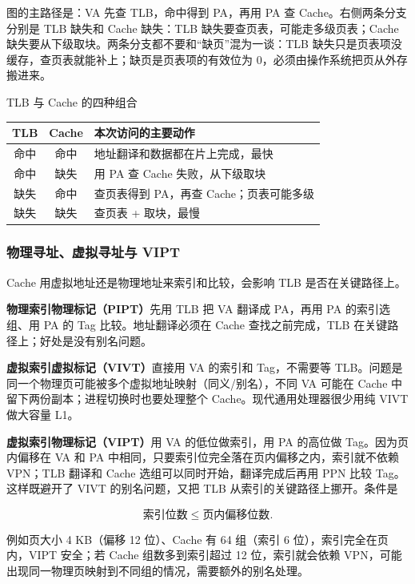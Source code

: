 图的主路径是：VA 先查 TLB，命中得到 PA，再用 PA 查 Cache。右侧两条分支分别是 TLB 缺失和 Cache 缺失：TLB 缺失要查页表，可能走多级页表；Cache 缺失要从下级取块。两条分支都不要和“缺页”混为一谈：TLB 缺失只是页表项没缓存，查页表就能补上；缺页是页表项的有效位为 0，必须由操作系统把页从外存搬进来。

\begin{tablebox}{TLB 与 Cache 的四种组合}
\centering
\begin{tabularx}{\linewidth}{|c|c|X|}
\hline
TLB & Cache & 本次访问的主要动作 \\
\hline
命中 & 命中 & 地址翻译和数据都在片上完成，最快 \\
命中 & 缺失 & 用 PA 查 Cache 失败，从下级取块 \\
缺失 & 命中 & 查页表得到 PA，再查 Cache；页表可能多级 \\
缺失 & 缺失 & 查页表 + 取块，最慢 \\
\hline
\end{tabularx}
\end{tablebox}

\subsubsection*{物理寻址、虚拟寻址与 VIPT}

Cache 用虚拟地址还是物理地址来索引和比较，会影响 TLB 是否在关键路径上。

\textbf{物理索引物理标记（PIPT）}先用 TLB 把 VA 翻译成 PA，再用 PA 的索引选组、用 PA 的 Tag 比较。地址翻译必须在 Cache 查找之前完成，TLB 在关键路径上；好处是没有别名问题。

\textbf{虚拟索引虚拟标记（VIVT）}直接用 VA 的索引和 Tag，不需要等 TLB。问题是同一个物理页可能被多个虚拟地址映射（同义/别名），不同 VA 可能在 Cache 中留下两份副本；进程切换时也要处理整个 Cache。现代通用处理器很少用纯 VIVT 做大容量 L1。

\textbf{虚拟索引物理标记（VIPT）}用 VA 的低位做索引，用 PA 的高位做 Tag。因为页内偏移在 VA 和 PA 中相同，只要索引位完全落在页内偏移之内，索引就不依赖 VPN；TLB 翻译和 Cache 选组可以同时开始，翻译完成后再用 PPN 比较 Tag。这样既避开了 VIVT 的别名问题，又把 TLB 从索引的关键路径上挪开。条件是

\[
\text{索引位数}\le \text{页内偏移位数}.
\]

例如页大小 4 KB（偏移 12 位）、Cache 有 64 组（索引 6 位），索引完全在页内，VIPT 安全；若 Cache 组数多到索引超过 12 位，索引就会依赖 VPN，可能出现同一物理页映射到不同组的情况，需要额外的别名处理。

